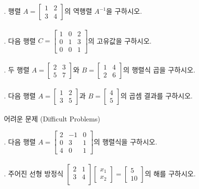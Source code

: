 \documentclass[fleqn]{article}
\begin{document}
. 행렬 \( A = \begin{bmatrix} 1 & 2 \\ 3 & 4 \end{bmatrix} \)의 역행렬 \( A^{-1} \)을 구하시오. \\\\

. 다음 행렬 \( C = \begin{bmatrix} 1 & 0 & 2 \\ 0 & 1 & 3 \\ 0 & 0 & 1 \end{bmatrix} \)의 고유값을 구하시오. \\\\

. 두 행렬 \( A = \begin{bmatrix} 2 & 3 \\ 5 & 7 \end{bmatrix} \)와 \( B = \begin{bmatrix} 1 & 4 \\ 2 & 6 \end{bmatrix} \)의 행렬식 곱을 구하시오. \\\\

. 다음 행렬 \( A = \begin{bmatrix} 1 & 2 \\ 3 & 5 \end{bmatrix} \)과 \( B = \begin{bmatrix} 4 \\ 5 \end{bmatrix} \)의 곱셈 결과를 구하시오. \\\\

 어려운 문제 (Difficult Problems)

. 다음 행렬 \( A = \begin{bmatrix} 2 & -1 & 0 \\ 0 & 3 & 1 \\ 4 & 0 & 1 \end{bmatrix} \)의 행렬식을 구하시오. \\\\

. 주어진 선형 방정식 \(\begin{bmatrix} 2 & 1 \\ 3 & 4 \\ \end{bmatrix} \begin{bmatrix} x_1 \\ x_2 \end{bmatrix} = \begin{bmatrix} 5 \\ 10 \end{bmatrix}\)의 해를 구하시오. \\\\
\end{document}
